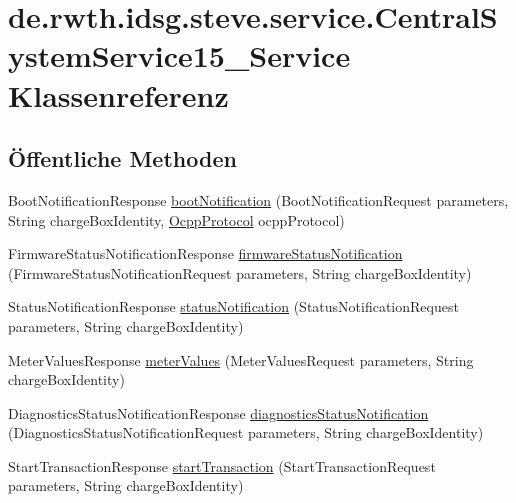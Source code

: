 \hypertarget{classde_1_1rwth_1_1idsg_1_1steve_1_1service_1_1_central_system_service15___service}{\section{de.\+rwth.\+idsg.\+steve.\+service.\+Central\+System\+Service15\+\_\+\+Service Klassenreferenz}
\label{classde_1_1rwth_1_1idsg_1_1steve_1_1service_1_1_central_system_service15___service}
}
\subsection*{Öffentliche Methoden}
\begin{DoxyCompactItemize}
\item 
Boot\+Notification\+Response \hyperlink{classde_1_1rwth_1_1idsg_1_1steve_1_1service_1_1_central_system_service15___service_acf877d4da5a9435a884b929f68530a44}{boot\+Notification} (Boot\+Notification\+Request parameters, String charge\+Box\+Identity, \hyperlink{enumde_1_1rwth_1_1idsg_1_1steve_1_1ocpp_1_1_ocpp_protocol}{Ocpp\+Protocol} ocpp\+Protocol)
\item 
Firmware\+Status\+Notification\+Response \hyperlink{classde_1_1rwth_1_1idsg_1_1steve_1_1service_1_1_central_system_service15___service_ac5062e047ef689c5526f49f8ec4e9b4a}{firmware\+Status\+Notification} (Firmware\+Status\+Notification\+Request parameters, String charge\+Box\+Identity)
\item 
Status\+Notification\+Response \hyperlink{classde_1_1rwth_1_1idsg_1_1steve_1_1service_1_1_central_system_service15___service_ab545723c39a68c74ea5d3704f02bb9a9}{status\+Notification} (Status\+Notification\+Request parameters, String charge\+Box\+Identity)
\item 
Meter\+Values\+Response \hyperlink{classde_1_1rwth_1_1idsg_1_1steve_1_1service_1_1_central_system_service15___service_a447c6b35033475a8e40f45312dff7d47}{meter\+Values} (Meter\+Values\+Request parameters, String charge\+Box\+Identity)
\item 
Diagnostics\+Status\+Notification\+Response \hyperlink{classde_1_1rwth_1_1idsg_1_1steve_1_1service_1_1_central_system_service15___service_a6fd6b72c9efd177f191088b2c9232a97}{diagnostics\+Status\+Notification} (Diagnostics\+Status\+Notification\+Request parameters, String charge\+Box\+Identity)
\item 
Start\+Transaction\+Response \hyperlink{classde_1_1rwth_1_1idsg_1_1steve_1_1service_1_1_central_system_service15___service_a62d29dc8a9bfe8a11e395d88b57d75f9}{start\+Transaction} (Start\+Transaction\+Request parameters, String charge\+Box\+Identity)

\end{DoxyCompactItemize}

